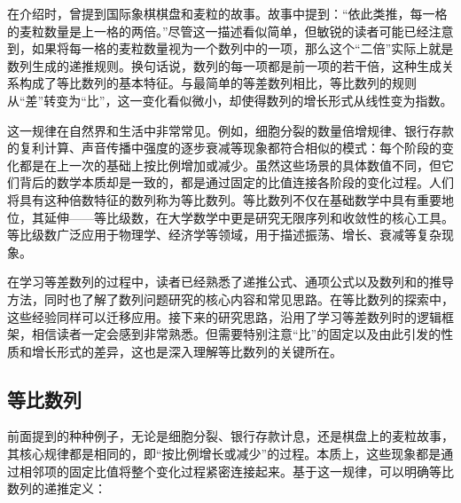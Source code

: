 

在介绍时，曾提到国际象棋棋盘和麦粒的故事。故事中提到：“依此类推，每一格的麦粒数量是上一格的两倍。”尽管这一描述看似简单，但敏锐的读者可能已经注意到，如果将每一格的麦粒数量视为一个数列中的一项，那么这个“二倍”实际上就是数列生成的递推规则。换句话说，数列的每一项都是前一项的若干倍，这种生成关系构成了等比数列的基本特征。与最简单的等差数列相比，等比数列的规则从“差”转变为“比”，这一变化看似微小，却使得数列的增长形式从线性变为指数。

这一规律在自然界和生活中非常常见。例如，细胞分裂的数量倍增规律、银行存款的复利计算、声音传播中强度的逐步衰减等现象都符合相似的模式：每个阶段的变化都是在上一次的基础上按比例增加或减少。虽然这些场景的具体数值不同，但它们背后的数学本质却是一致的，都是通过固定的比值连接各阶段的变化过程。人们将具有这种倍数特征的数列称为等比数列。等比数列不仅在基础数学中具有重要地位，其延伸——等比级数，在大学数学中更是研究无限序列和收敛性的核心工具。等比级数广泛应用于物理学、经济学等领域，用于描述振荡、增长、衰减等复杂现象。

在学习等差数列的过程中，读者已经熟悉了递推公式、通项公式以及数列和的推导方法，同时也了解了数列问题研究的核心内容和常见思路。在等比数列的探索中，这些经验同样可以迁移应用。接下来的研究思路，沿用了学习等差数列时的逻辑框架，相信读者一定会感到非常熟悉。但需要特别注意“比”的固定以及由此引发的性质和增长形式的差异，这也是深入理解等比数列的关键所在。

\subsection{等比数列}

前面提到的种种例子，无论是细胞分裂、银行存款计息，还是棋盘上的麦粒故事，其核心规律都是相同的，即“按比例增长或减少”的过程。本质上，这些现象都是通过相邻项的固定比值将整个变化过程紧密连接起来。基于这一规律，可以明确等比数列的递推定义：

